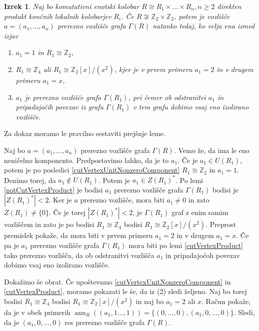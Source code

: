 \documentclass[a4paper, 12pt]{amsart}
\theoremstyle{definition} %
\theoremstyle{plain} %
\newtheorem{izrek}[definicija]{Izrek}
\newcommand{\Z}{\mathbb Z}
\DeclareMathOperator{\ann}{ann}
\begin{document}
\begin{izrek}
\label{cutVertexClassification}
Naj bo komutativni enotski kolobar $R\cong R_1\times \dots \times R_n, n\ge2$ direkten produkt končnih lokalnih kolobarjev $R_i$. Če $R\not\cong \Z_2 \times \Z_2$, potem je vozlišče $a=(a_1,\dots,a_n)$ prerezno vozlišče grafa $\Gamma(R)$ natanko tedaj, ko velja ena izmed  izjav
\begin{enumerate}
\item $a_1=1$ in $R_1 \cong \Z_2$,
\item $R_1\cong \Z_4$ ali $R_1\cong \Z_2[x]/(x^2)$, kjer je v prvem primeru $a_1=2$ in v drugem primeru $a_1 = x$,
\item $a_1$ je prerezno vozlišče grafa $\Gamma(R_1)$, pri čemer ob odstranitvi $a_1$ in pripadajočih povezav iz grafa $\Gamma(R_1)$ v tem grafu dobimo vsaj eno izolirano vozlišče.
\end{enumerate}
\end{izrek}

\proof
Za dokaz moramo le pravilno sestaviti prejšnje leme.

Naj bo $a=(a_1,\dots,a_n)$ prerezno vozlišče grafa $\Gamma(R)$. Vemo že, da ima le eno neničelno komponento. Predpostavimo lahko, da je to $a_1$. Če je $a_1\in U(R_1)$, potem je po posledici  \ref{cutVertexUnitNonzeroComponent} $R_1\cong \Z_2$ in $a_1 = 1$. Denimo torej, da $a_1 \notin U(R_1)$. Potem je $a_1 \in Z(R_1)^*$. Po lemi \ref{notCutVertexProduct} je bodisi $a_1$ prerezno vozlišče grafa $\Gamma(R_1)$ bodisi je $|Z(R_1)^*| < 2$. Ker je $a$ prerezno vozlišče, mora biti $a_1\neq 0$ in zato $Z(R_1) \neq \{0\}$. Če je torej $|Z(R_1)^*| < 2$, je $\Gamma(R_1)$ graf z enim samim vozliščem in zato je po \cite{Anderson-klasifikacijaMalihGrafov} bodisi $R_1  \cong \Z_4$ bodisi $R_1  \cong \Z_2[x]/(x^2)$. Preprost premislek pokaže, da mora biti v prvem primeru $a_1 = 2$ in v drugem $a_1 = x$. Če pa je $a_1$ prerezno vozlišče grafa $\Gamma(R_1)$ mora biti po lemi \ref{cutVertexProduct} tako prerezno vozlišča, da ob odstranitvi vozlišča $a_1$ in pripadajočoh povezav dobimo vsaj eno izolirano vozlišče.

Dokažimo še obrat. Če upoštevamo \ref{cutVertexUnitNonzeroComponent} in \ref{cutVertexProduct}, moramo pokazati le še, da iz (2) sledi željeno. Naj bo torej bodisi $R_1\cong \Z_4$ bodisi $R_1 \cong \Z_2[x]/(x^2)$ in naj bo $a_1 = 2$ ali $x$. Račun pokaže, da je v obeh primerih $ \ann_R((a_1,1\dots,1)) = \{(0,\dots,0),(a_1,0,\dots,0)\}$. Sledi, da je $(a_1,0,\dots,0)$ res prerezno vozlišče grafa $\Gamma(R)$.
\endproof
\end{document}
